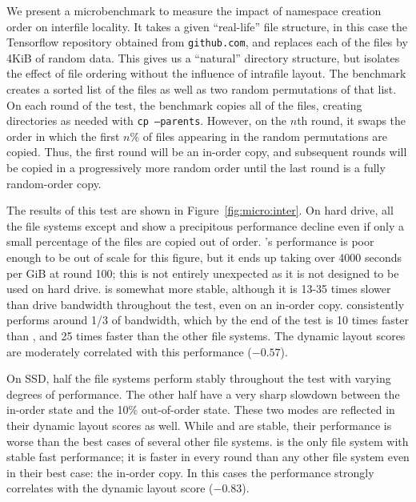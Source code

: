 
We present a microbenchmark to measure the impact of namespace creation order
on interfile locality. It takes a given ``real-life'' file structure, in this
case the Tensorflow repository obtained from \texttt{github.com}, and replaces
each of the files by 4KiB of random data. This gives us a ``natural'' directory
structure, but isolates the effect of file ordering without the influence of
intrafile layout. The benchmark creates a sorted list of the files as well as two
random permutations of that list. On each round of the test, the benchmark
 copies all of
the files, creating directories as needed with {\tt cp --parents}.  However, on
the $n$th round, it swaps the order in which the first $n\%$ of files appearing
in the random permutations are copied. Thus, the first round will be an in-order
copy, and subsequent rounds will be copied in a progressively more random
order until the last round is a fully random-order copy.

The results of this test are shown in Figure~\ref{fig:micro:inter}.  On hard
drive, all the file systems except \betrfs and \xfs show a precipitous
performance decline even if only a small percentage of the files are copied out
of order. \ftwofs's performance is poor enough to be out of scale for this
figure, but it ends up taking over 4000 seconds per GiB at round 100; this is
not entirely unexpected as it is not designed to be used on hard drive. \xfs is
somewhat more stable, although it is 13-35 times slower than drive bandwidth
throughout the test, even on an in-order copy.  \betrfs consistently performs
around 1/3 of bandwidth, which by the end of the test is 10 times faster than
\xfs, and 25 times faster than the other file systems. The dynamic layout
scores are moderately correlated with this performance ($-0.57$).

On SSD, half the file systems perform stably throughout the test with varying
degrees of performance. The other half have a very sharp slowdown between the
in-order state and the 10\% out-of-order state. These two modes are reflected
in their dynamic layout scores as well. While \ext and \zfs are stable, their
performance is worse than the best cases of several other file systems.
\betrfs is the only file system with stable fast performance; it is faster in
every round than any other file system even in their best case: the in-order
copy. In this cases the performance strongly correlates with the dynamic layout
score ($-0.83$).


